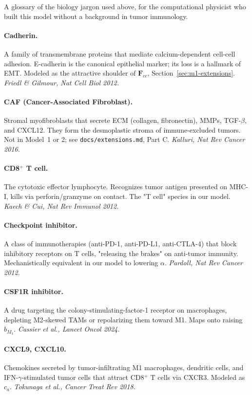 \documentclass[11pt,letterpaper]{article}
\begin{document}
A glossary of the biology jargon used above, for the computational
physicist who built this model without a background in tumor immunology.

\paragraph{Cadherin.}
A family of transmembrane proteins that mediate calcium-dependent
cell-cell adhesion. E-cadherin is the canonical epithelial marker;
its loss is a hallmark of EMT. Modeled as the attractive shoulder of
$\mathbf{F}_{cc}$, Section~\ref{sec:m1-extensions}. \emph{Friedl \& Gilmour, Nat
Cell Biol 2012.}

\paragraph{CAF (Cancer-Associated Fibroblast).}
Stromal myofibroblasts that secrete ECM (collagen, fibronectin), MMPs,
TGF-$\beta$, and CXCL12. They form the desmoplastic stroma of
immune-excluded tumors. Not in Model~1 or 2; see
\texttt{docs/extensions.md}, Part C. \emph{Kalluri, Nat Rev Cancer 2016.}

\paragraph{CD8$^+$ T cell.}
The cytotoxic effector lymphocyte. Recognizes tumor antigen presented
on MHC-I, kills via perforin/granzyme on contact. The "T cell" species
in our model. \emph{Kaech \& Cui, Nat Rev Immunol 2012.}

\paragraph{Checkpoint inhibitor.}
A class of immunotherapies (anti-PD-1, anti-PD-L1, anti-CTLA-4) that
block inhibitory receptors on T cells, "releasing the brakes" on
anti-tumor immunity. Mechanistically equivalent in our model to lowering
$\alpha$. \emph{Pardoll, Nat Rev Cancer 2012.}

\paragraph{CSF1R inhibitor.}
A drug targeting the colony-stimulating-factor-1 receptor on
macrophages, depleting M2-skewed TAMs or repolarizing them toward M1.
Maps onto raising $b_{M_1}$. \emph{Cassier et al., Lancet Oncol 2024.}

\paragraph{CXCL9, CXCL10.}
Chemokines secreted by tumor-infiltrating M1 macrophages, dendritic
cells, and IFN-$\gamma$-stimulated tumor cells that attract CD8$^+$ T
cells via CXCR3. Modeled as $c_a$. \emph{Tokunaga et al., Cancer Treat
Rev 2018.}
\end{document}
